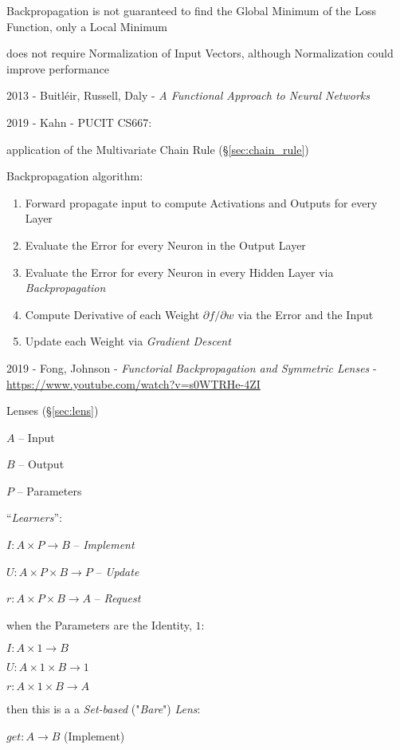 Backpropagation is not guaranteed to find the Global Minimum of the Loss
Function, only a Local Minimum

does not require Normalization of Input Vectors, although Normalization could
improve performance

2013 - Buitl\'eir, Russell, Daly -
\emph{A Functional Approach to Neural Networks}

2019 - Kahn - PUCIT CS667:

application of the Multivariate Chain Rule (\S\ref{sec:chain_rule})

Backpropagation algorithm:
\begin{enumerate}
  \item Forward propagate input to compute Activations and Outputs for every
    Layer
  \item Evaluate the Error for every Neuron in the Output Layer
  \item Evaluate the Error for every Neuron in every Hidden Layer via
    \emph{Backpropagation}
  \item Compute Derivative of each Weight $\partial f / \partial w$ via the
    Error and the Input
  \item Update each Weight via \emph{Gradient Descent}
\end{enumerate}

\asterism

2019 - Fong, Johnson - \emph{Functorial Backpropagation and Symmetric Lenses} -
\url{https://www.youtube.com/watch?v=s0WTRHe-4ZI}

\fist Lenses (\S\ref{sec:lens})

$A$ -- Input

$B$ -- Output

$P$ -- Parameters

``\emph{Learners}'':

$I : A \times P \to B$ -- \emph{Implement}

$U : A \times P \times B \to P$ -- \emph{Update}

$r : A \times P \times B \to A$ -- \emph{Request}

when the Parameters are the Identity, $1$:

$I : A \times 1 \to B$

$U : A \times 1 \times B \to 1$

$r : A \times 1 \times B \to A$

then this is a a \emph{Set-based} ("\emph{Bare}") \emph{Lens}:

$get : A \to B$ (Implement)

